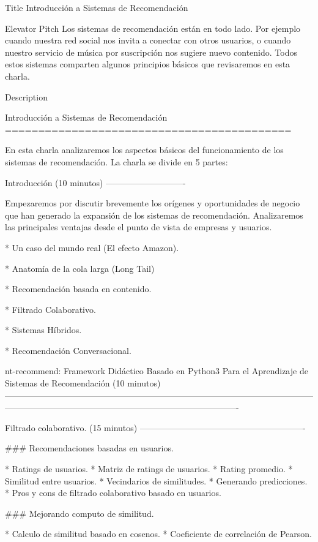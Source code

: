 Title
Introducción a Sistemas de Recomendación


Elevator Pitch
Los sistemas de recomendación están en todo lado.
Por ejemplo cuando nuestra red social nos invita a conectar con otros usuarios,
o cuando nuestro servicio de música por suscripción nos sugiere nuevo contenido.
Todos estos sistemas comparten algunos principios básicos que revisaremos en esta charla.


Description


Introducción a Sistemas de Recomendación
===========================================

En esta charla analizaremos los aspectos básicos del funcionamiento de los sistemas de recomendación.
La charla se divide en 5 partes:

Introducción (10 minutos)
----------------------------

Empezaremos por discutir brevemente los orígenes y oportunidades de negocio que han generado la expansión
de los sistemas de recomendación. Analizaremos las principales ventajas desde el punto de vista de empresas
y usuarios.

* Un caso del mundo real (El efecto Amazon).

* Anatomía de la cola larga (Long Tail)

* Recomendación basada en contenido.

* Filtrado Colaborativo.

* Sistemas Híbridos.

* Recomendación Conversacional.


nt-recommend: Framework Didáctico Basado en Python3 Para el Aprendizaje de Sistemas de Recomendación (10 minutos)
----------------------------------------------------------------------------------------------------------------------------------------------------------------------------------------------


Filtrado colaborativo. (15 minutos)
----------------------------------------------------------

### Recomendaciones basadas en usuarios.

* Ratings de usuarios.
* Matriz de ratings de usuarios.
* Rating promedio.
* Similitud entre usuarios.
* Vecindarios de similitudes.
* Generando predicciones.
* Pros y cons de filtrado colaborativo basado en usuarios.

### Mejorando computo de similitud.

* Calculo de similitud basado en cosenos.
* Coeficiente de correlación de Pearson.

